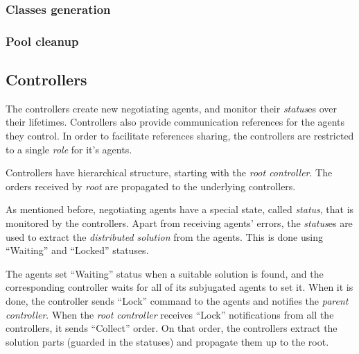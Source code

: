 \subsubsection{Classes generation}


\subsubsection{Pool cleanup}





\subsection{Controllers}

The controllers create new negotiating agents, and monitor their \emph{status}es
over their lifetimes. Controllers also provide communication references for the
agents they control. In order to facilitate references sharing, the controllers
are restricted to a single \emph{role} for it's agents.

Controllers have hierarchical structure, starting with the \emph{root
  controller}. The orders received by \emph{root} are propagated to
the underlying controllers.

\medskip

As mentioned before, negotiating agents have a special state,
called \emph{status}, that is monitored by the controllers. Apart
from receiving agents' errors, the \emph{status}es are used to
extract the \emph{distributed solution} from the agents.
This is done using ``Waiting'' and ``Locked'' statuses.

The agents set ``Waiting'' status when a suitable solution is found,
and the corresponding controller waits for all of its subjugated
agents to set it. When it is done, the controller sends ``Lock''
command to the agents and notifies the \emph{parent controller}.
When the \emph{root controller} receives ``Lock'' notifications from
all the controllers, it sends ``Collect'' order. On that order, the controllers
extract the solution parts (guarded in the statuses) and propagate them up to
the root.









